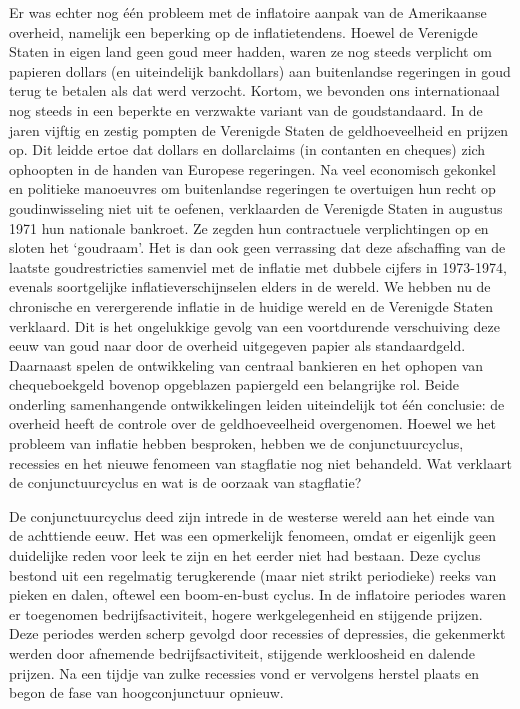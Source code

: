 \documentclass[
  a5paper,
  smalldemyvopaper,10pt,twoside,onecolumn,openright,extrafontsizes,hidelinks]{memoir}
\begin{document}
Er was echter nog één probleem met de inflatoire aanpak van de
Amerikaanse overheid, namelijk een beperking op de inflatietendens.
Hoewel de Verenigde Staten in eigen land geen goud meer hadden, waren ze
nog steeds verplicht om papieren dollars (en uiteindelijk bankdollars)
aan buitenlandse regeringen in goud terug te betalen als dat werd
verzocht. Kortom, we bevonden ons internationaal nog steeds in een
beperkte en verzwakte variant van de goudstandaard. In de jaren vijftig
en zestig pompten de Verenigde Staten de geldhoeveelheid en prijzen op.
Dit leidde ertoe dat dollars en dollarclaims (in contanten en cheques)
zich ophoopten in de handen van Europese regeringen. Na veel economisch
gekonkel en politieke manoeuvres om buitenlandse regeringen te
overtuigen hun recht op goudinwisseling niet uit te oefenen, verklaarden
de Verenigde Staten in augustus 1971 hun nationale bankroet. Ze zegden
hun contractuele verplichtingen op en sloten het `goudraam'. Het is dan
ook geen verrassing dat deze afschaffing van de laatste goudrestricties
samenviel met de inflatie met dubbele cijfers in 1973-1974, evenals
soortgelijke inflatieverschijnselen elders in de wereld. We hebben nu de
chronische en verergerende inflatie in de huidige wereld en de Verenigde
Staten verklaard. Dit is het ongelukkige gevolg van een voortdurende
verschuiving deze eeuw van goud naar door de overheid uitgegeven papier
als standaardgeld. Daarnaast spelen de ontwikkeling van centraal
bankieren en het ophopen van chequeboekgeld bovenop opgeblazen
papiergeld een belangrijke rol. Beide onderling samenhangende
ontwikkelingen leiden uiteindelijk tot één conclusie: de overheid heeft
de controle over de geldhoeveelheid overgenomen. Hoewel we het probleem
van inflatie hebben besproken, hebben we de conjunctuurcyclus, recessies
en het nieuwe fenomeen van stagflatie nog niet behandeld. Wat verklaart
de conjunctuurcyclus en wat is de oorzaak van stagflatie?

De conjunctuurcyclus deed zijn intrede in de westerse wereld aan het
einde van de achttiende eeuw. Het was een opmerkelijk fenomeen, omdat er
eigenlijk geen duidelijke reden voor leek te zijn en het eerder niet had
bestaan. Deze cyclus bestond uit een regelmatig terugkerende (maar niet
strikt periodieke) reeks van pieken en dalen, oftewel een boom-en-bust
cyclus. In de inflatoire periodes waren er toegenomen
bedrijfsactiviteit, hogere werkgelegenheid en stijgende prijzen. Deze
periodes werden scherp gevolgd door recessies of depressies, die
gekenmerkt werden door afnemende bedrijfsactiviteit, stijgende
werkloosheid en dalende prijzen. Na een tijdje van zulke recessies vond
er vervolgens herstel plaats en begon de fase van hoogconjunctuur
opnieuw.
\end{document}
